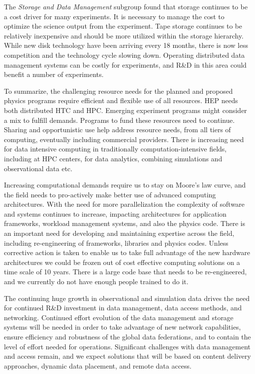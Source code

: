 The {\it Storage and Data Management} subgroup found that storage  continues to be a cost driver for many experiments. It is necessary to manage the cost to optimize the science output from the experiment.   Tape storage continues to be relatively inexpensive and should be more utilized within the storage hierarchy.  While new disk technology have been arriving every 18 months, there is now less competition and the technology cycle slowing down.  Operating distributed data management systems can be costly for experiments, and R\&D in this area could benefit a number of experiments.

To summarize, the challenging resource needs for the planned and proposed physics programs require efficient and flexible use of all resources. HEP needs both distributed HTC and HPC. Emerging experiment programs might consider a mix to fulfill demands. Programs to fund these resources need to continue. Sharing and opportunistic use help address resource needs, from all tiers of computing, eventually including commercial providers. There is increasing need for data intensive computing in traditionally computation-intensive fields, including at HPC centers, for data analytics, combining simulations and observational data etc. 

Increasing computational demands require us to stay on Moore’s law curve, and the field needs to pro-actively make better use of advanced computing architectures. With the need for more parallelization the complexity of software and systems continues to increase, impacting architectures for application frameworks, workload management systems, and also the physics code. There is an important need for developing and maintaining expertise across the field, including re-engineering of frameworks, libraries and physics codes. Unless corrective action is taken to enable us to take full advantage of the new hardware architectures we could be frozen out of cost effective computing solutions on a time scale of 10 years. There is a large code base that needs to be re-engineered, and we currently do not have enough people trained to do it.

The continuing huge growth in observational and simulation data drives the need for continued R\&D investment in data management, data access methods, and networking.  Continued effort evolution of the data management and storage systems will be needed in order to take advantage of new network capabilities, ensure efficiency and robustness of the global data federations, and to contain the level of effort needed for operations. Significant challenges with data management and access remain, and we expect solutions that will be based on content delivery approaches, dynamic data placement, and remote data access. 

